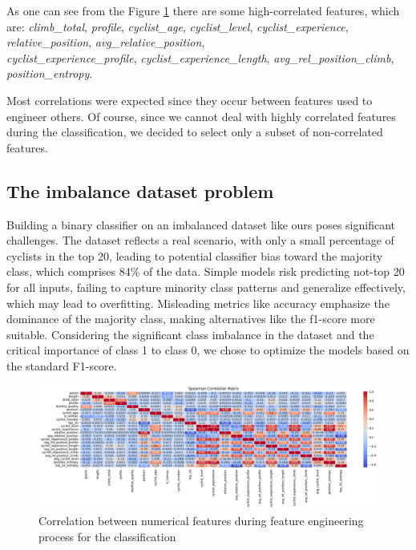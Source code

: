 \noindent As one can see from the Figure \ref{fig:class-correlations} there are some high-correlated features, which are: \textit{climb\_total}, \textit{profile}, \textit{cyclist\_age}, \textit{cyclist\_level}, \textit{cyclist\_experience}, \textit{relative\_position}, \textit{avg\_relative\_position}, \\ \textit{cyclist\_experience\_profile}, \textit{cyclist\_experience\_length}, \textit{avg\_rel\_position\_climb}, \textit{position\_entropy}.

Most correlations were expected since they occur between features used to engineer others. Of course, since we cannot deal with highly correlated features during the classification, we decided to select only a subset of non-correlated features.


\subsection{The imbalance dataset problem}
\label{subsec:imbalancing}
Building a binary classifier on an imbalanced dataset like ours poses significant challenges. The dataset reflects a real scenario, with only a small percentage of cyclists in the top 20, leading to potential classifier bias toward the majority class, which comprises 84\% of the data. Simple models risk predicting not-top 20 for all inputs, failing to capture minority class patterns and generalize effectively, which may lead to overfitting. Misleading metrics like accuracy emphasize the dominance of the majority class, making alternatives like the f1-score more suitable. Considering the significant class imbalance in the dataset and the critical importance of class 1 to class 0, we chose to optimize the models based on the standard F1-score.

\begin{figure}[H]
    \centering
    \includegraphics[width=0.88\linewidth]{images/CLASSIFICATION/correlations.png}
    \caption{\small Correlation between numerical features during feature engineering process for the classification}
    \label{fig:class-correlations}
\end{figure}





